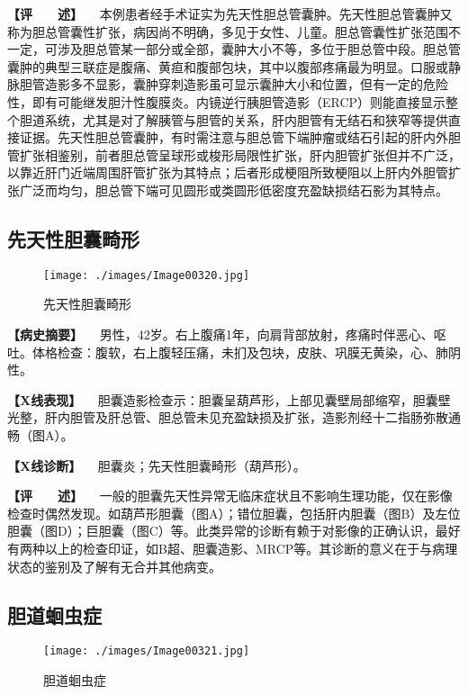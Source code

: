 \textbf{【评　　述】}
　本例患者经手术证实为先天性胆总管囊肿。先天性胆总管囊肿又称为胆总管囊性扩张，病因尚不明确，多见于女性、儿童。胆总管囊性扩张范围不一定，可涉及胆总管某一部分或全部，囊肿大小不等，多位于胆总管中段。胆总管囊肿的典型三联症是腹痛、黄疸和腹部包块，其中以腹部疼痛最为明显。口服或静脉胆管造影多不显影，囊肿穿刺造影虽可显示囊肿大小和位置，但有一定的危险性，即有可能继发胆汁性腹膜炎。内镜逆行胰胆管造影（ERCP）则能直接显示整个胆道系统，尤其是对了解胰管与胆管的关系，肝内胆管有无结石和狭窄等提供直接证据。先天性胆总管囊肿，有时需注意与胆总管下端肿瘤或结石引起的肝内外胆管扩张相鉴别，前者胆总管呈球形或梭形局限性扩张，肝内胆管扩张但并不广泛，以靠近肝门近端周围肝管扩张为其特点；后者形成梗阻所致梗阻以上肝内外胆管扩张广泛而均匀，胆总管下端可见圆形或类圆形低密度充盈缺损结石影为其特点。

\subsection{先天性胆囊畸形}

\begin{figure}[!htbp]
 \centering
 \texttt{[image: ./images/Image00320.jpg]}
 \captionsetup{justification=centering}
 \caption{先天性胆囊畸形}
 \label{fig5-8-2}
  \end{figure} 

\textbf{【病史摘要】}
　男性，42岁。右上腹痛1年，向肩背部放射，疼痛时伴恶心、呕吐。体格检查：腹软，右上腹轻压痛，未扪及包块，皮肤、巩膜无黄染，心、肺阴性。

\textbf{【X线表现】}
　胆囊造影检查示：胆囊呈葫芦形，上部见囊壁局部缩窄，胆囊壁光整，肝内胆管及肝总管、胆总管未见充盈缺损及扩张，造影剂经十二指肠弥散通畅（图A）。

\textbf{【X线诊断】} 　胆囊炎；先天性胆囊畸形（葫芦形）。

\textbf{【评　　述】}
　一般的胆囊先天性异常无临床症状且不影响生理功能，仅在影像检查时偶然发现。如葫芦形胆囊（图A）；错位胆囊，包括肝内胆囊（图B）及左位胆囊（图D）；巨胆囊（图C）等。此类异常的诊断有赖于对影像的正确认识，最好有两种以上的检查印证，如B超、胆囊造影、MRCP等。其诊断的意义在于与病理状态的鉴别及了解有无合并其他病变。

\subsection{胆道蛔虫症}

\begin{figure}[!htbp]
 \centering
 \texttt{[image: ./images/Image00321.jpg]}
 \captionsetup{justification=centering}
 \caption{胆道蛔虫症}
 \label{fig5-8-3}
  \end{figure} 

